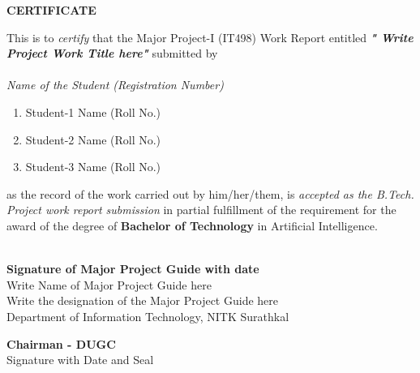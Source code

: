\begin{framed}
	\begin{center}
		\textbf{{\Large CERTIFICATE}}
	\end{center}
	\null
	This is to \textit{certify} that the Major Project-I (IT498) Work Report entitled \textit{\textbf{" Write Project Work Title here"}} submitted by \\
	\\
	\textit{Name of the Student (Registration Number)}
	\begin{enumerate}[label={(\arabic*)}]
		\item  Student-1 Name (Roll No.)
		\item  Student-2 Name (Roll No.)
		\item  Student-3 Name (Roll No.)
	\end{enumerate}
	as the record of the work carried out by him/her/them, is \textit{accepted as the B.Tech. Project work report submission} in partial fulfillment of the requirement for the award of the degree of \textbf {Bachelor of Technology} in Artificial Intelligence.
	\\
    \\
	\begin{minipage}{14cm}
		\begin{center}                                      	\vspace{1.5cm}	
			\textbf{Signature of Major Project Guide with date}
            \\Write Name of Major Project Guide here
            \\Write the designation of the Major Project Guide here \\
			Department of Information Technology, NITK Surathkal \\
			\end{center}       
     \vspace{0.75cm}
        \begin{center}                                      	\vspace{1.5cm}	
			\textbf{Chairman - DUGC}
            \\{Signature with Date and Seal}
          	\end{center} 
	\end{minipage}
\\
\\
\\
\\
\\
\end{framed}
\thispagestyle{empty}
\clearpage
